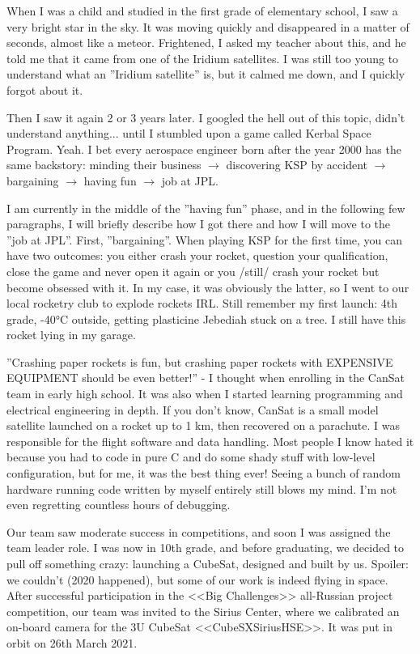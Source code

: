 \documentclass[letter,11pt]{article}
\begin{document}
    \begin{justify}
    When I was a child and studied in the first grade of elementary school, I saw a very bright star in the sky. It was moving quickly and disappeared in a matter of seconds, almost like a meteor. Frightened, I asked my teacher about this, and he told me that it came from one of the Iridium satellites. I was still too young to understand what an ''Iridium satellite'' is, but it calmed me down, and I quickly forgot about it.
    \setlength{\parskip}{1em}
    \setlength{\parindent}{0em}

    Then I saw it again 2 or 3 years later. I googled the hell out of this topic, didn't understand anything... until I stumbled upon a game called Kerbal Space Program. Yeah. I bet every aerospace engineer born after the year 2000 has the same backstory: minding their business $\rightarrow$ discovering KSP by accident $\rightarrow$ bargaining $\rightarrow$ having fun $\rightarrow$ job at JPL.

    I am currently in the middle of the ''having fun'' phase, and in the following few paragraphs, I will briefly describe how I got there and how I will move to the ''job at JPL''.
    First, ''bargaining''. When playing KSP for the first time, you can have two outcomes: you either crash your rocket, question your qualification, close the game and never open it again or you /still/ crash your rocket but become obsessed with it. In my case, it was obviously the latter, so I went to our local rocketry club to explode rockets IRL. Still remember my first launch: 4th grade, -40°C outside, getting plasticine Jebediah stuck on a tree. I still have this rocket lying in my garage.

    ''Crashing paper rockets is fun, but crashing paper rockets with EXPENSIVE EQUIPMENT should be even better!'' - I thought when enrolling in the CanSat team in early high school. It was also when I started learning programming and electrical engineering in depth. If you don't know, CanSat is a small model satellite launched on a rocket up to 1 km, then recovered on a parachute. I was responsible for the flight software and data handling. Most people I know hated it because you had to code in pure C and do some shady stuff with low-level configuration, but for me, it was the best thing ever! Seeing a bunch of random hardware running code written by myself entirely still blows my mind. I'm not even regretting countless hours of debugging.

    Our team saw moderate success in competitions, and soon I was assigned the team leader role. I was now in 10th grade, and before graduating, we decided to pull off something crazy: launching a CubeSat, designed and built by us. Spoiler: we couldn't (2020 happened), but some of our work is indeed flying in space. After successful participation in the <<Big Challenges>> all-Russian project competition, our team was invited to the Sirius Center, where we calibrated an on-board camera for the 3U CubeSat <<CubeSXSiriusHSE>>. It was put in orbit on 26th March 2021.


\end{justify}
\end{document}
